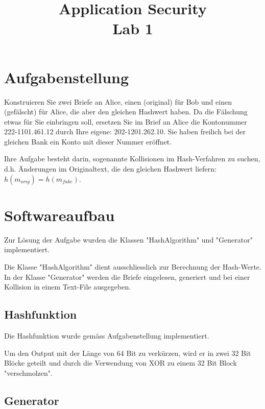 \documentclass[12pt]{scrartcl}
\title{ %
Application Security
\\Lab 1
\vspace{0.2cm}
}
\begin{document}
 \maketitle
 \thispagestyle{firststyle}
 \pagestyle{firststyle}
 \begin{abstract}
 \begin{center}
 \end{center}
 \vspace{0.5cm}
\hrulefill
\end{abstract}

 \pagestyle{documentstyle}
 \tableofcontents
 \pagebreak
\section{Aufgabenstellung}
Konstruieren Sie zwei Briefe an Alice, einen (original) für Bob und einen (gefälscht) für Alice, die aber den gleichen Hashwert haben. Da die Fälschung etwas für Sie einbringen soll, ersetzen Sie im Brief an Alice die Kontonummer 222-1101.461.12 durch Ihre eigene: 202-1201.262.10. Sie haben freilich bei der gleichen Bank ein Konto mit dieser Nummer eröffnet.

Ihre Aufgabe besteht darin, sogenannte Kollisionen im Hash-Verfahren zu suchen, d.h. Änderungen
im Originaltext, die den gleichen Hashwert liefern: $ h(m_{orig}) = h(m_{fake})$.

\section{Softwareaufbau}
Zur Lösung der Aufgabe wurden die Klassen "{}HashAlgorithm"{} und "{}Generator"{} implementiert.

Die Klasse "{}HashAlgorithm"{} dient ausschliesslich zur Berechnung der Hash-Werte. In der Klasse "{}Generator"{} werden die Briefe eingelesen, generiert und bei einer Kollision in einem Text-File ausgegeben.

\subsection{Hashfunktion}
Die Hashfunktion wurde gemäss Aufgabenstellung implementiert.

Um den Output mit der Länge von 64 Bit zu verkürzen, wird er in zwei 32 Bit Blöcke geteilt und durch die Verwendung von XOR zu einem 32 Bit Block "verschmolzen".

\subsection{Generator}
\end{document}
